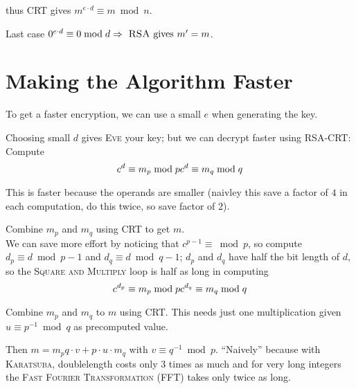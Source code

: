 thus \textsc{CRT} gives $m^{e \cdot d} \equiv m \bmod n$.

Last case $0^{e \cdot d} \equiv 0 \bmod d \Rightarrow \text{ \textsc{RSA} gives } m' = m$.

\section{Making the Algorithm Faster}

To get a faster encryption, we can use a small $e$ when generating the key.

Choosing small $d$ gives \textsc{Eve} your key; but we can decrypt faster using \textsc{RSA-CRT}: Compute
\[
c^d \equiv m_p \bmod p \\
c^d \equiv m_q \bmod q \\
\]

This is faster because the operands are smaller (naivley this save a factor of $4$ in each computation, do this twice, so save factor of $2$).

Combine $m_p$ and $m_q$ using \textsc{CRT} to get $m$. \\

We can save more effort by noticing that $c^{p-1} \equiv \bmod p$, so compute $d_p \equiv d \bmod p-1$ and $d_q \equiv d \bmod q-1$; $d_p$ and $d_q$ have half the bit length of $d$, so the \textsc{Square and Multiply} loop is half as long in computing
\[
c^{d_p} \equiv m_p \bmod p \\
c^{d_q} \equiv m_q \bmod q \\
\]

Combine $m_p$ and $m_q$ to $m$ using \textsc{CRT}. This needs just one multiplication given $u \equiv p^{-1} \bmod q$ as precomputed value.

Then $m = m_p q \cdot v + p \cdot u \cdot m_q$ with $v \equiv q^{-1} \bmod p$. ``Naively'' because with \textsc{Karatsuba}, doublelength costs only 3 times as much and for very long integers the \textsc{Fast Fourier Transformation (FFT)} takes only twice as long.